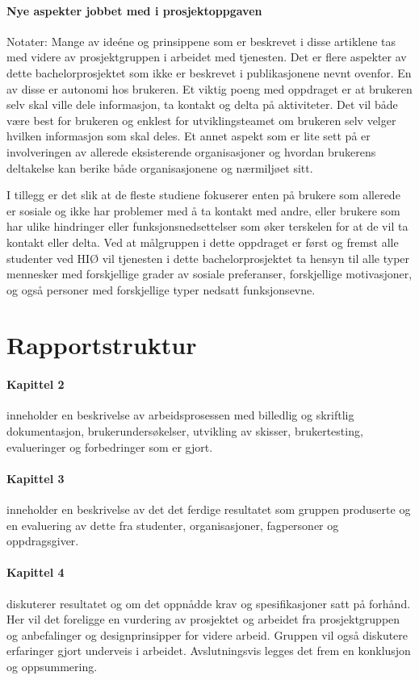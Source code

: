 \paragraph{Nye aspekter jobbet med i prosjektoppgaven}
Notater:
Mange av ideéne og prinsippene som er beskrevet i disse artiklene tas med videre av prosjektgruppen i arbeidet med tjenesten. Det er flere aspekter av dette bachelorprosjektet som ikke er beskrevet i publikasjonene nevnt ovenfor. En av disse er autonomi hos brukeren. Et viktig poeng med oppdraget er at brukeren selv skal ville dele informasjon, ta kontakt og delta på aktiviteter. Det vil både være best for brukeren og enklest for utviklingsteamet om brukeren selv velger hvilken informasjon som skal deles. Et annet aspekt som er lite sett på er involveringen av allerede eksisterende organisasjoner og hvordan brukerens deltakelse kan berike både organisasjonene og nærmiljøet sitt. 

I tillegg er det slik at de fleste studiene fokuserer enten på brukere som allerede er sosiale og ikke har problemer med å ta kontakt med andre, eller brukere som har ulike hindringer eller funksjonsnedsettelser som øker terskelen for at de vil ta kontakt eller delta. Ved at målgruppen i dette oppdraget er først og fremst alle studenter ved HIØ vil tjenesten i dette bachelorprosjektet ta hensyn til alle typer mennesker med forskjellige grader av sosiale preferanser, forskjellige motivasjoner, og også personer med forskjellige typer nedsatt funksjonsevne.

\section{Rapportstruktur}
\paragraph{Kapittel 2} inneholder en beskrivelse av arbeidsprosessen med billedlig og skriftlig dokumentasjon, brukerundersøkelser, utvikling av skisser, brukertesting, evalueringer og forbedringer som er gjort.

\paragraph{Kapittel 3}
inneholder en beskrivelse av det det ferdige resultatet som gruppen produserte og en evaluering av dette fra studenter, organisasjoner, fagpersoner og oppdragsgiver.

\paragraph{Kapittel 4}
diskuterer resultatet og om det oppnådde krav og spesifikasjoner satt på forhånd. Her vil det foreligge en vurdering av prosjektet og arbeidet fra prosjektgruppen og anbefalinger og designprinsipper for videre arbeid. Gruppen vil også diskutere erfaringer gjort underveis i arbeidet. Avslutningsvis legges det frem en konklusjon og oppsummering.

